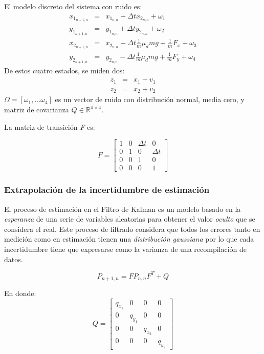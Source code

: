 El modelo discreto del sistema con ruido es:
\begin{eqnarray*}
x_{1_{n+1,n}} &=& x_{1_{n,n}} + \Delta t x_{2_{n,n}} + \omega_1\\ %
y_{1_{n+1,n}} &=& y_{1_{n,n}} + \Delta t y_{2_{n,n}} + \omega_2\\ %
x_{2_{n+1,n}} &=& x_{2_{n,n}} - \Delta t \frac{1}{m}\mu_d m g + \frac{1}{m} F_x + \omega_3\\ %
y_{2_{n+1,n}} &=& y_{2_{n,n}} - \Delta t \frac{1}{m}\mu_d m g + \frac{1}{m} F_y + \omega_4 %
\end{eqnarray*}
De estos cuatro estados, se miden dos:
\begin{eqnarray*}
z_1 &=& x_1 + v_1\\
z_2 &=& x_2 + v_2
\end{eqnarray*}
$\Omega = [\omega_1, ... \omega_4]$ es un vector de ruido con distribución normal, media cero, y matriz de covarianza $Q\in \mathbb{R}^{4\times 4}$.


La matriz de transición \textit{F} es:

\begin{equation}
F = \begin{bmatrix}
1 & 0 & \Delta t & 0\\ 
0 & 1 & 0 & \Delta t\\ 
0 & 0 & 1 & 0\\ 
0 & 0 & 0 & 1
\end{bmatrix}
\label{eq:transition_matrix}
\end{equation}


		\subsubsection*{Extrapolación de la incertidumbre de estimación}
	El proceso de estimación en el Filtro de Kalman es un modelo basado en la \textit{esperanza} de una serie de variables aleatorias para obtener el valor \textit{oculto} que se considera el real. Este proceso de filtrado considera que todos los errores tanto en medición como en estimación tienen una \textit{distribución gaussiana} por lo que cada incertidumbre tiene que expresarse como la varianza de una recompilación de datos.
	
\begin{equation}
P_{n+1,n} = F P_{n,n} F^{T} + Q
\label{eq:extrapolation_covariance}
\end{equation}

En donde:
\begin{equation}
Q =
\begin{bmatrix}
q_{x_1} & 0 & 0 & 0\\ 
0 & q_{y_1} & 0 & 0\\ 
0 & 0 & q_{x_2} & 0\\ 
0 & 0 & 0   & q_{y_2}
\end{bmatrix}
\end{equation}	

